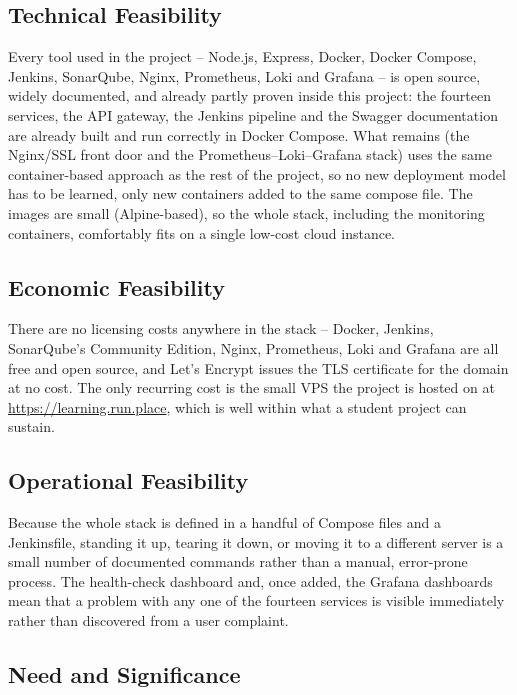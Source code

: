 \documentclass[12pt,a4paper]{article}
\begin{document}
\subsection{Technical Feasibility}

Every tool used in the project -- Node.js,
Express, Docker, Docker Compose, Jenkins, SonarQube, Nginx, Prometheus, Loki
and Grafana -- is open source, widely documented, and already partly proven inside this
project: the fourteen services, the API gateway, the Jenkins pipeline and the
Swagger documentation are already built and run correctly in Docker Compose.
What remains (the Nginx/SSL front door and the Prometheus--Loki--Grafana
stack) uses the same container-based approach as the rest of the project, so
no new deployment model has to be learned, only new containers added to the
same compose file. The images are small (Alpine-based), so the whole stack,
including the monitoring containers, comfortably fits on a single low-cost
cloud instance.

\subsection{Economic Feasibility}

There are no licensing costs anywhere in the
stack -- Docker, Jenkins, SonarQube's Community Edition, Nginx, Prometheus,
Loki and Grafana are all free and open source, and Let's Encrypt issues the
TLS certificate for the domain at no
cost. The only recurring cost is the small VPS the project is hosted on at
\url{https://learning.run.place}, which is well within what a student project
can sustain.

\subsection{Operational Feasibility}

Because the whole stack is defined in a
handful of Compose files and a Jenkinsfile, standing it up, tearing it down,
or moving it to a different server is a small number of documented commands
rather than a manual, error-prone process. The health-check dashboard and,
once added, the Grafana dashboards mean that a problem with any one of the
fourteen services is visible immediately rather than discovered from a user
complaint.

\subsection{Need and Significance}
\end{document}

